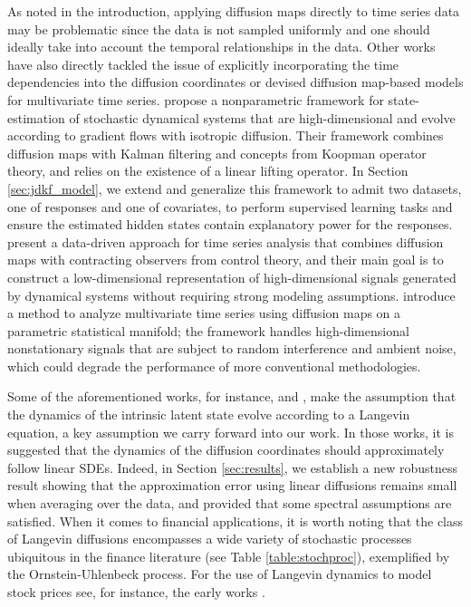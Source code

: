 \documentclass[11pt]{article}
\theoremstyle{plain}
\theoremstyle{definition}
\theoremstyle{remark}
\numberwithin{equation}{section}
\begin{document}
As noted in the introduction, applying diffusion maps directly to time series data may be problematic since the data is not sampled uniformly and one should ideally take into account the temporal relationships in the data. Other works have also directly tackled the issue of explicitly incorporating the time dependencies into the diffusion coordinates or devised diffusion map-based models for multivariate time series. \citet{shnitzer2020diffusion} propose a nonparametric framework for state-estimation of stochastic dynamical systems that are high-dimensional and evolve according to gradient flows with isotropic diffusion. Their framework combines diffusion maps with Kalman filtering and concepts from Koopman operator theory, and relies on the existence of a linear lifting operator. In Section \ref{sec:jdkf_model}, we extend and generalize this framework to admit two datasets, one of responses and one of covariates, to perform supervised learning tasks and ensure the estimated hidden states contain explanatory power for the responses. \citet{shnitzer2022manifold} present a data-driven approach for time series analysis that combines diffusion maps with contracting observers from control theory, and their main goal is to construct a low-dimensional representation of high-dimensional signals generated by dynamical systems without requiring strong modeling assumptions. \citet{lian_multivariate_2015} introduce a method to analyze multivariate time series using diffusion maps on a parametric statistical manifold; the framework handles high-dimensional nonstationary signals that are subject to random interference and ambient noise, which could degrade the performance of more conventional methodologies.

Some of the aforementioned works, for instance, \citet{coifman2008diffusion} and \citet{shnitzer2020diffusion}, make the assumption that the dynamics of the intrinsic latent state evolve according to a Langevin equation, a key assumption we carry forward into our work. In those works, it is suggested that the dynamics of the diffusion coordinates should approximately follow linear SDEs. Indeed, in Section \ref{sec:results}, we establish a new robustness result showing that the approximation error using linear diffusions remains small when averaging over the data, and provided that some spectral assumptions are satisfied. When it comes to financial applications, it is worth noting that the class of Langevin diffusions encompasses a wide variety of stochastic processes ubiquitous in the finance literature (see 
Table \ref{table:stochproc}), exemplified by the Ornstein-Uhlenbeck process. For the use of Langevin dynamics to model stock prices see, for instance, the early works \citet{bouchaud1998langevin,Canessa2001}.
\end{document}
